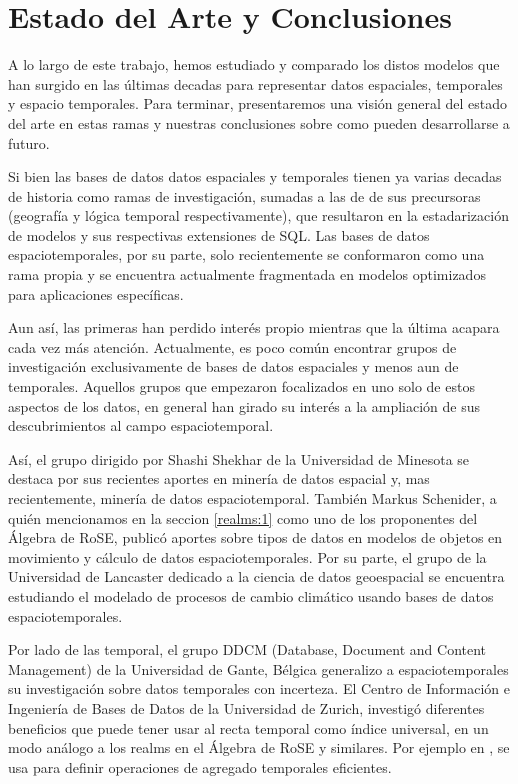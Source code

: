 \chapter{Estado del Arte y Conclusiones}  \label{cap:conc}

A lo largo de este trabajo, hemos estudiado y comparado los distos modelos que han surgido en las últimas decadas para representar datos espaciales, temporales y espacio temporales. Para terminar, presentaremos una visión general del estado del arte en estas ramas y nuestras conclusiones sobre como pueden desarrollarse a futuro.

Si bien las bases de datos datos espaciales y temporales tienen ya varias decadas de historia como ramas de investigación, sumadas a las de de sus precursoras (geografía y lógica temporal respectivamente), que resultaron en la estadarización de modelos y sus respectivas extensiones de SQL. Las bases de datos espaciotemporales, por su parte, solo recientemente se conformaron como una rama propia y se encuentra actualmente fragmentada en modelos optimizados para aplicaciones específicas.

Aun así, las primeras han perdido interés propio mientras que la última acapara cada vez más atención. Actualmente, es poco común encontrar grupos de investigación exclusivamente de bases de datos espaciales y menos aun de temporales. Aquellos grupos que empezaron focalizados en uno solo de estos aspectos de los datos, en general han girado su interés a la ampliación de sus descubrimientos al campo espaciotemporal.

Así, el grupo dirigido por Shashi Shekhar de la Universidad de Minesota se destaca por sus recientes aportes en minería de datos espacial\textsuperscript{\cite{spatial:datamining}} y, mas recientemente, minería de datos espaciotemporal\textsuperscript{\cite{spatiotemporal:datamining}}. También Markus Schenider, a quién mencionamos en la seccion \ref{realms:1} como uno de los proponentes del Álgebra de RoSE, publicó aportes sobre tipos de datos en modelos de objetos en movimiento\textsuperscript{\cite{schenider:moving}} y cálculo de datos espaciotemporales\textsuperscript{\cite{schenider:calculo}}. Por su parte, el grupo de la Universidad de Lancaster dedicado a la ciencia de datos geoespacial se encuentra estudiando el modelado de procesos de cambio climático usando bases de datos espaciotemporales\textsuperscript{\cite{climate}}.

Por lado de las temporal, el grupo DDCM (Database, Document and Content Management) de la Universidad
de Gante, Bélgica generalizo a espaciotemporales\textsuperscript{\cite{gant:st}} su investigación sobre datos
temporales con incerteza\textsuperscript{\cite{gant:t}}. El Centro de Información e Ingeniería de Bases de Datos de la Universidad de Zurich, investigó diferentes beneficios que puede tener usar al recta temporal como
índice universal, en un modo análogo a los realms en el Álgebra de RoSE y similares. Por ejemplo en \cite{sweeping}, se usa para definir operaciones de agregado temporales eficientes.

